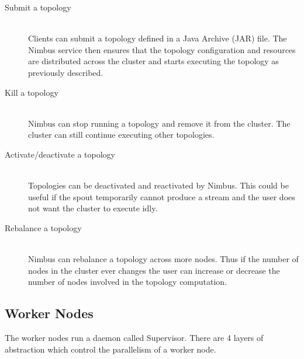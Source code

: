 \documentclass[bsc,logo,frontabs,twoside,singlespacing,normalheadings,parskip]{infthesis}\usepackage[]{graphicx}\usepackage[]{color}
\begin{document}
\begin{description}
	\item[Submit a topology] \hfill \\
	Clients can submit a topology defined in a Java Archive (JAR) file. The Nimbus service then ensures that the topology configuration and resources are distributed across the cluster and starts executing the topology as previously described.
	\item[Kill a topology] \hfill \\
	Nimbus can stop running a topology and remove it from the cluster. The cluster can still continue executing other topologies.
	\item[Activate/deactivate a topology] \hfill \\
	Topologies can be deactivated and reactivated by Nimbus. This could be useful if the spout temporarily cannot produce a stream and the user does not want the cluster to execute idly.
	\item[Rebalance a topology] \hfill \\
	Nimbus can rebalance a topology across more nodes. Thus if the number of nodes in the cluster ever changes the user can increase or decrease the number of nodes involved in the topology computation.
\end{description}

\subsection{Worker Nodes}

The worker nodes run a daemon called Supervisor. There are 4 layers of abstraction which control the parallelism of a worker node.
\end{document}
